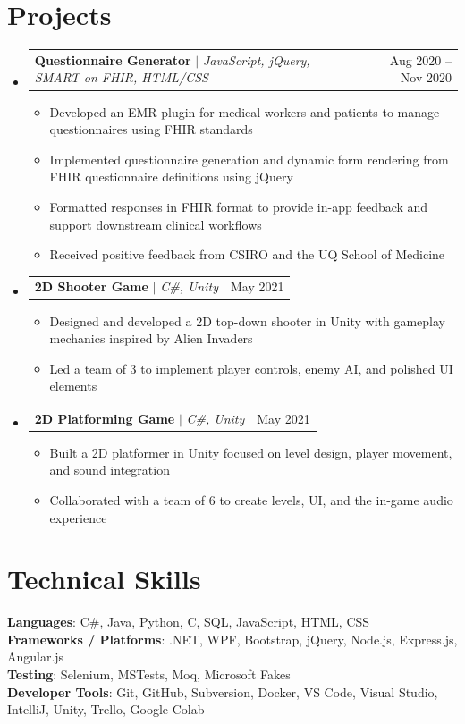 \documentclass[letterpaper,11pt]{article}
\makeatletter
\newcommand{\resumeItem}[1]{
  \item\small{
    {#1 \vspace{-2pt}}
  }
}
\newcommand{\resumeProjectHeading}[2]{
    \item
    \begin{tabular*}{0.97\textwidth}{l@{\extracolsep{\fill}}r}
      \small#1 & #2 \\
    \end{tabular*}\vspace{-7pt}
}
\newcommand{\resumeSubHeadingListStart}{\begin{itemize}[leftmargin=0.15in, label={}]}
\newcommand{\resumeSubHeadingListEnd}{\end{itemize}}
\newcommand{\resumeItemListStart}{\begin{itemize}}
\newcommand{\resumeItemListEnd}{\end{itemize}\vspace{-5pt}}
\makeatother
\begin{document}
\section{Projects}
    \resumeSubHeadingListStart
	\resumeProjectHeading
          {\textbf{Questionnaire Generator} $|$ \emph{JavaScript, jQuery, SMART on FHIR, HTML/CSS}}{Aug 2020 -- Nov 2020}
          \resumeItemListStart
            \resumeItem{Developed an EMR plugin for medical workers and patients to manage questionnaires using FHIR standards}
            \resumeItem{Implemented questionnaire generation and dynamic form rendering from FHIR questionnaire definitions using jQuery}
            \resumeItem{Formatted responses in FHIR format to provide in-app feedback and support downstream clinical workflows}
            \resumeItem{Received positive feedback from CSIRO and the UQ School of Medicine}
          \resumeItemListEnd
	\resumeProjectHeading
          {\textbf{2D Shooter Game} $|$ \emph{C\#, Unity}}{May 2021}
          \resumeItemListStart
            \resumeItem{Designed and developed a 2D top-down shooter in Unity with gameplay mechanics inspired by Alien Invaders}
            \resumeItem{Led a team of 3 to implement player controls, enemy AI, and polished UI elements}
          \resumeItemListEnd
	\resumeProjectHeading
          {\textbf{2D Platforming Game} $|$ \emph{C\#, Unity}}{May 2021}
          \resumeItemListStart
            \resumeItem{Built a 2D platformer in Unity focused on level design, player movement, and sound integration}
            \resumeItem{Collaborated with a team of 6 to create levels, UI, and the in-game audio experience}
          \resumeItemListEnd
    \resumeSubHeadingListEnd

%
\section{Technical Skills}
 \begin{itemize}[leftmargin=0.15in, label={}]
    \small{\item{
     \textbf{Languages}{: C\#, Java, Python, C, SQL, JavaScript, HTML, CSS} \\
     \textbf{Frameworks / Platforms}{: .NET, WPF, Bootstrap, jQuery, Node.js, Express.js, Angular.js} \\
     \textbf{Testing}{: Selenium, MSTests, Moq, Microsoft Fakes} \\
     \textbf{Developer Tools}{: Git, GitHub, Subversion, Docker, VS Code, Visual Studio, IntelliJ, Unity, Trello, Google Colab}
    }}
 \end{itemize}
\end{document}
